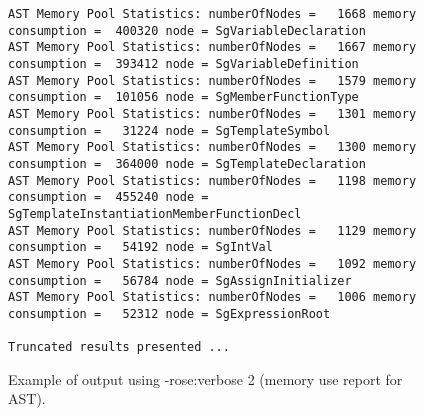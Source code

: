 \begin{figure}[!h]
{\begin{verbatim}
AST Memory Pool Statistics: numberOfNodes =   1668 memory consumption =  400320 node = SgVariableDeclaration
AST Memory Pool Statistics: numberOfNodes =   1667 memory consumption =  393412 node = SgVariableDefinition
AST Memory Pool Statistics: numberOfNodes =   1579 memory consumption =  101056 node = SgMemberFunctionType
AST Memory Pool Statistics: numberOfNodes =   1301 memory consumption =   31224 node = SgTemplateSymbol
AST Memory Pool Statistics: numberOfNodes =   1300 memory consumption =  364000 node = SgTemplateDeclaration
AST Memory Pool Statistics: numberOfNodes =   1198 memory consumption =  455240 node = SgTemplateInstantiationMemberFunctionDecl
AST Memory Pool Statistics: numberOfNodes =   1129 memory consumption =   54192 node = SgIntVal
AST Memory Pool Statistics: numberOfNodes =   1092 memory consumption =   56784 node = SgAssignInitializer
AST Memory Pool Statistics: numberOfNodes =   1006 memory consumption =   52312 node = SgExpressionRoot

Truncated results presented ...
\end{verbatim}
}
\caption{Example of output using -rose:verbose 2 (memory use report for AST).}
\label{Tutorial:exampleOutput_IRTypeMemoryUse}
\end{figure}

